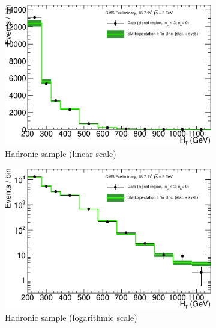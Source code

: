 \clearpage
\begin{figure}[h!]
  \centering
  \begin{subfigure}[b]{0.48\textwidth}
    \includegraphics[width=\textwidth]
    {Figs/results/v0/greenBand/single_plots/hadronic_0b_le3j.pdf}
    \caption{Hadronic sample (linear scale)}
  \end{subfigure}
  \vspace{0.7cm}\begin{subfigure}[b]{0.48\textwidth}
    \includegraphics[width=\textwidth]
    {Figs/results/v0/greenBand/single_plots/hadronic_0b_le3j_logy.pdf}
    \caption{Hadronic sample (logarithmic scale)}
  \end{subfigure}
  \begin{subfigure}[b]{0.48\textwidth}

\end{subfigure}
\end{figure}

